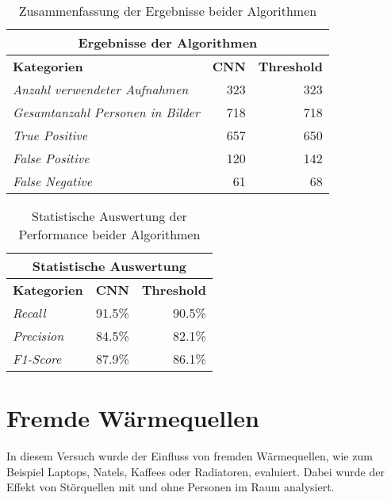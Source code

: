 {
	\renewcommand{\arraystretch}{1.3}
	
	\begin{table}[H]
		\scriptsize
		\centering
		\begin{tabularx}{.5\textwidth}{Xrr}\\
			\hline
			\multicolumn{3}{c}{\textbf{Ergebnisse der Algorithmen}}\\
			\hline
			\textbf{Kategorien} & \textbf{CNN} & \textbf{Threshold}\\
			\hline
			\textit{Anzahl verwendeter Aufnahmen} & 323 & 323\\
			\hline 
			\textit{Gesamtanzahl Personen in Bilder} & 718 & 718\\
			\hline
			\textit{True Positive} & 657 & 650\\
			\hline
			\textit{False Positive} & 120 & 142\\
			\hline
			\textit{False Negative} & 61 & 68\\
		\end{tabularx}
		\caption{Zusammenfassung der Ergebnisse beider Algorithmen}
		\label{tbl:results}
	\end{table}
	\begin{table}[H]
		\scriptsize
		\centering
		\begin{tabularx}{.5\textwidth}{Xrr}
			\hline
			\multicolumn{3}{c}{\textbf{Statistische Auswertung}}\\
			\hline
			\textbf{Kategorien} & \textbf{CNN} & \textbf{Threshold}\\
			\hline
			\textit{Recall} & 91.5\% & 90.5\%\\
			\hline  
			\textit{Precision} & 84.5\% & 82.1\%\\
			\hline
			\textit{F1-Score} & 87.9\% & 86.1\%\\
			\hline
		\end{tabularx}
		\caption{Statistische Auswertung der Performance beider Algorithmen}
		\label{tbl:stat}
	\end{table}
}

\section{Fremde Wärmequellen}
\label{sec:FremdeWärmequellen}

In diesem Versuch wurde der Einfluss von fremden Wärmequellen, wie zum Beispiel Laptops, Natels, Kaffees oder Radiatoren, evaluiert. Dabei wurde der Effekt von Störquellen mit und ohne Personen im Raum analysiert.

